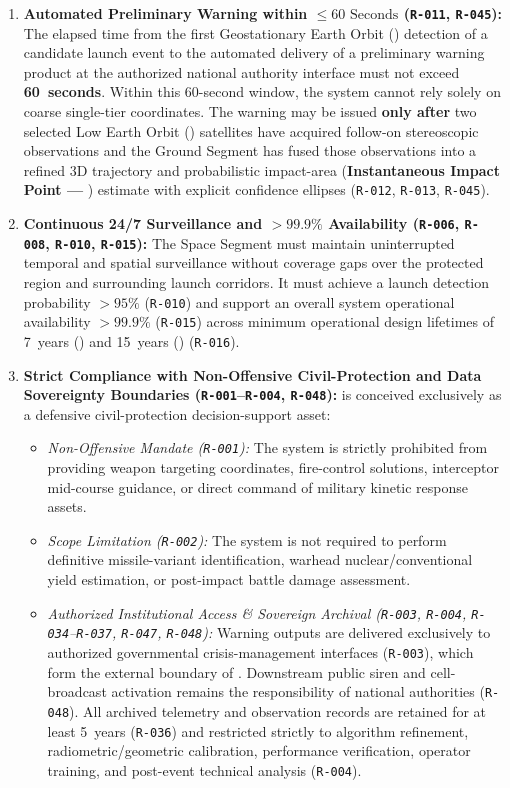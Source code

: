 \begin{enumerate}
    \item \textbf{Automated Preliminary Warning within $\le 60\text{ Seconds}$ (\texttt{R-011}, \texttt{R-045}):} The elapsed time from the first Geostationary Earth Orbit () detection of a candidate launch event to the automated delivery of a preliminary warning product at the authorized national authority interface must not exceed \textbf{60~seconds}. Within this 60-second window, the system cannot rely solely on coarse single-tier  coordinates. The warning may be issued \textbf{only after} two selected Low Earth Orbit () satellites have acquired follow-on stereoscopic observations and the Ground Segment has fused those observations into a refined 3D trajectory and probabilistic impact-area (\textbf{Instantaneous Impact Point --- }) estimate with explicit confidence ellipses (\texttt{R-012}, \texttt{R-013}, \texttt{R-045}).
    \item \textbf{Continuous 24/7 Surveillance and $> 99.9\%$ Availability (\texttt{R-006}, \texttt{R-008}, \texttt{R-010}, \texttt{R-015}):} The Space Segment must maintain uninterrupted temporal and spatial surveillance without coverage gaps over the protected region and surrounding launch corridors. It must achieve a launch detection probability $> 95\%$ (\texttt{R-010}) and support an overall system operational availability $> 99.9\%$ (\texttt{R-015}) across minimum operational design lifetimes of 7~years () and 15~years () (\texttt{R-016}).
    \item \textbf{Strict Compliance with Non-Offensive Civil-Protection and Data Sovereignty Boundaries (\texttt{R-001}--\texttt{R-004}, \texttt{R-048}):}  is conceived exclusively as a defensive civil-protection decision-support asset:
    \begin{itemize}
        \item \emph{Non-Offensive Mandate (\texttt{R-001}):} The system is strictly prohibited from providing weapon targeting coordinates, fire-control solutions, interceptor mid-course guidance, or direct command of military kinetic response assets.
        \item \emph{Scope Limitation (\texttt{R-002}):} The system is not required to perform definitive missile-variant identification, warhead nuclear/conventional yield estimation, or post-impact battle damage assessment.
        \item \emph{Authorized Institutional Access \& Sovereign Archival (\texttt{R-003}, \texttt{R-004}, \texttt{R-034}--\texttt{R-037}, \texttt{R-047}, \texttt{R-048}):} Warning outputs are delivered exclusively to authorized governmental crisis-management interfaces (\texttt{R-003}), which form the external boundary of . Downstream public siren and cell-broadcast activation remains the responsibility of national authorities (\texttt{R-048}). All archived telemetry and observation records are retained for at least 5~years (\texttt{R-036}) and restricted strictly to algorithm refinement, radiometric/geometric calibration, performance verification, operator training, and post-event technical analysis (\texttt{R-004}).

\end{itemize}
\end{enumerate}
